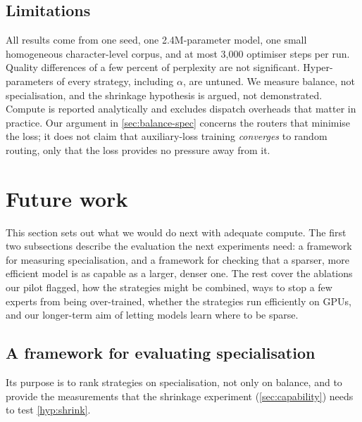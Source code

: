 \documentclass[10pt]{article}
\theoremstyle{definition}
\theoremstyle{remark}
\begin{document}
\subsection{Limitations}
\label{sec:limitations}
All results come from one seed, one 2.4M-parameter model, one small homogeneous character-level corpus, and at most 3{,}000 optimiser steps per run. Quality differences of a few percent of perplexity are not significant. Hyper-parameters of every strategy, including $\alpha$, are untuned. We measure balance, not specialisation, and the shrinkage hypothesis is argued, not demonstrated. Compute is reported analytically and excludes dispatch overheads that matter in practice. Our argument in \cref{sec:balance-spec} concerns the routers that minimise the loss; it does not claim that auxiliary-loss training \emph{converges} to random routing, only that the loss provides no pressure away from it.

\section{Future work}
\label{sec:protocol}

This section sets out what we would do next with adequate compute. The first two subsections describe the evaluation the next experiments need: a framework for measuring specialisation, and a framework for checking that a sparser, more efficient model is as capable as a larger, denser one. The rest cover the ablations our pilot flagged, how the strategies might be combined, ways to stop a few experts from being over-trained, whether the strategies run efficiently on GPUs, and our longer-term aim of letting models learn where to be sparse.

\subsection{A framework for evaluating specialisation}
\label{sec:spec-eval}
Its purpose is to rank strategies on specialisation, not only on balance, and to provide the measurements that the shrinkage experiment (\cref{sec:capability}) needs to test \cref{hyp:shrink}.
\end{document}
